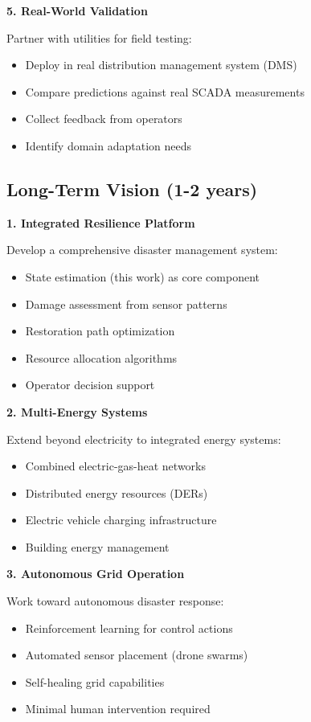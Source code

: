 \documentclass[12pt,a4paper]{report}
\begin{document}
\textbf{5. Real-World Validation}

Partner with utilities for field testing:
\begin{itemize}
    \item Deploy in real distribution management system (DMS)
    \item Compare predictions against real SCADA measurements
    \item Collect feedback from operators
    \item Identify domain adaptation needs
\end{itemize}

\subsection{Long-Term Vision (1-2 years)}

\textbf{1. Integrated Resilience Platform}

Develop a comprehensive disaster management system:
\begin{itemize}
    \item State estimation (this work) as core component
    \item Damage assessment from sensor patterns
    \item Restoration path optimization
    \item Resource allocation algorithms
    \item Operator decision support
\end{itemize}

\textbf{2. Multi-Energy Systems}

Extend beyond electricity to integrated energy systems:
\begin{itemize}
    \item Combined electric-gas-heat networks
    \item Distributed energy resources (DERs)
    \item Electric vehicle charging infrastructure
    \item Building energy management
\end{itemize}

\textbf{3. Autonomous Grid Operation}

Work toward autonomous disaster response:
\begin{itemize}
    \item Reinforcement learning for control actions
    \item Automated sensor placement (drone swarms)
    \item Self-healing grid capabilities
    \item Minimal human intervention required
\end{itemize}
\end{document}
